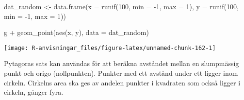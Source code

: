 \documentclass[
]{book}
\newenvironment{Shaded}{\begin{snugshade}}{\end{snugshade}}
\newcommand{\AttributeTok}[1]{\textcolor[rgb]{0.77,0.63,0.00}{#1}}
\newcommand{\DecValTok}[1]{\textcolor[rgb]{0.00,0.00,0.81}{#1}}
\newcommand{\FunctionTok}[1]{\textcolor[rgb]{0.00,0.00,0.00}{#1}}
\newcommand{\NormalTok}[1]{#1}
\newcommand{\OtherTok}[1]{\textcolor[rgb]{0.56,0.35,0.01}{#1}}
\newcommand{\SpecialCharTok}[1]{\textcolor[rgb]{0.00,0.00,0.00}{#1}}
\theoremstyle{definition}
\theoremstyle{definition}
\theoremstyle{definition}
\theoremstyle{definition}
\theoremstyle{remark}
\begin{document}
\begin{Shaded}
\begin{Highlighting}[]
\NormalTok{dat\_random }\OtherTok{\textless{}{-}} \FunctionTok{data.frame}\NormalTok{(}\AttributeTok{x =} \FunctionTok{runif}\NormalTok{(}\DecValTok{100}\NormalTok{, }\AttributeTok{min =} \SpecialCharTok{{-}}\DecValTok{1}\NormalTok{, }\AttributeTok{max =} \DecValTok{1}\NormalTok{),}
                         \AttributeTok{y =} \FunctionTok{runif}\NormalTok{(}\DecValTok{100}\NormalTok{, }\AttributeTok{min =} \SpecialCharTok{{-}}\DecValTok{1}\NormalTok{, }\AttributeTok{max =} \DecValTok{1}\NormalTok{))}

\NormalTok{g }\SpecialCharTok{+} \FunctionTok{geom\_point}\NormalTok{(}\FunctionTok{aes}\NormalTok{(x, y), }\AttributeTok{data =}\NormalTok{ dat\_random)}
\end{Highlighting}
\end{Shaded}

\begin{center}\texttt{[image: R-anvisningar\_files/figure-latex/unnamed-chunk-162-1]} \end{center}

Pytagoras sats kan användas för att beräkna avståndet mellan en slumpmässig punkt och origo (nollpunkten). Punkter med ett avstånd under ett ligger inom cirkeln. Cirkelns area ska ges av andelen punkter i kvadraten som också ligger i cirkeln, gånger fyra.

\begin{Shaded}
\end{Shaded}
\end{document}
